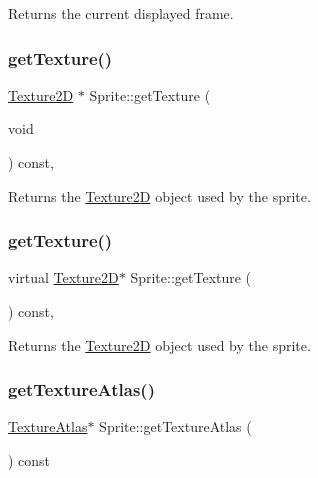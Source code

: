 Returns the current displayed frame. \mbox{\label{classSprite_a4358bf91cfd222db7e3d84e63d029031}} 
\subsubsection{\texorpdfstring{get\+Texture()}{getTexture()}\hspace{0.1cm}{\footnotesize\ttfamily [1/2]}}
{\footnotesize\ttfamily \hyperlink{classTexture2D}{Texture2D} $\ast$ Sprite\+::get\+Texture (\begin{DoxyParamCaption}\item[{void}]{ }\end{DoxyParamCaption}) const\hspace{0.3cm}{\ttfamily [override]}, {\ttfamily [virtual]}}

Returns the \hyperlink{classTexture2D}{Texture2D} object used by the sprite. \mbox{\label{classSprite_a2b60b30fbc4462b0357368de107780f9}} 
\subsubsection{\texorpdfstring{get\+Texture()}{getTexture()}\hspace{0.1cm}{\footnotesize\ttfamily [2/2]}}
{\footnotesize\ttfamily virtual \hyperlink{classTexture2D}{Texture2D}$\ast$ Sprite\+::get\+Texture (\begin{DoxyParamCaption}{ }\end{DoxyParamCaption}) const\hspace{0.3cm}{\ttfamily [override]}, {\ttfamily [virtual]}}

Returns the \hyperlink{classTexture2D}{Texture2D} object used by the sprite. \mbox{\label{classSprite_ab4ebd2216b9e419d81581b1072ce1254}} 
\subsubsection{\texorpdfstring{get\+Texture\+Atlas()}{getTextureAtlas()}\hspace{0.1cm}{\footnotesize\ttfamily [1/2]}}
{\footnotesize\ttfamily \hyperlink{classTextureAtlas}{Texture\+Atlas}$\ast$ Sprite\+::get\+Texture\+Atlas (\begin{DoxyParamCaption}{ }\end{DoxyParamCaption}) const\hspace{0.3cm}{\ttfamily [inline]}}

